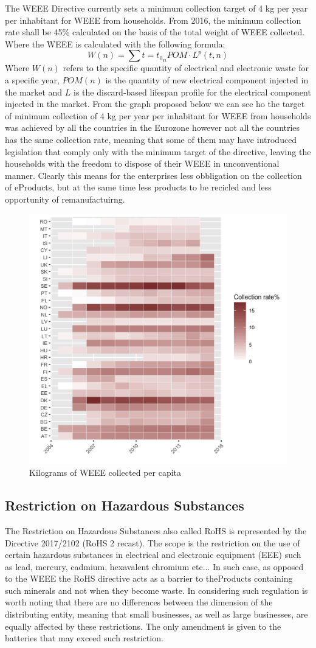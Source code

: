 \documentclass{article}
\begin{document}
  The WEEE Directive currently sets a minimum collection target of 4 kg per year per inhabitant for WEEE from households. From 2016, the minimum collection rate shall be 45\% calculated on the basis of the total weight of WEEE collected. Where the WEEE is calculated with the following formula:
  $$
  W (n) = \sum{t = t_0}_{n} POM \cdot L^p(t,n)
  $$
  Where $W(n)$ refers to the specific quantity of electrical and electronic waste for a specific year, $POM(n)$ is the quantity of new electrical component injected in the market and $L$ is the discard-based lifespan profile for the electrical component injected in the market. From the graph proposed below we can see ho the target of minimum collection of 4 kg per year per inhabitant for WEEE from households was achieved by all the countries in the Eurozone however not all the countries has the same collection rate, meaning that some of them may have introduced legislation that comply only with the minimum target of the directive, leaving the households with the freedom to dispose of their WEEE in unconventional manner. Clearly this means for the enterprises less obbligation on the collection of eProducts, but at the same time less products to be recicled and less opportunity of remanufactuirng.

  \begin{figure}
  \centering
  \includegraphics[width=0.5\linewidth]{Images/heatmap.png}
  \caption{Kilograms of WEEE collected per capita}
  \end{figure}

\subsection{Restriction on Hazardous Substances}
  The Restriction on Hazardous Substances also called RoHS is represented by the Directive 2017/2102 (RoHS 2 recast). The scope is the restriction on the use of certain hazardous substances in electrical and electronic equipment (EEE) such as lead, mercury, cadmium, hexavalent chromium etc... In such case, as opposed to the WEEE the RoHS directive acts as a barrier to theProducts containing such minerals and not when they become waste. In considering such regulation is worth noting that there are no differences between the dimension of the distributing entity, meaning that small businesses, as well as large businesses, are equally affected by these restrictions. The only amendment is given to the batteries that may exceed such restriction.
\end{document}

